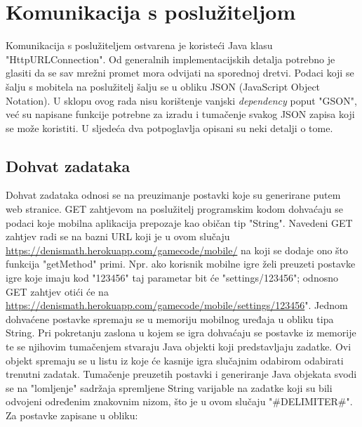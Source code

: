 \documentclass[times, utf8, zavrsni, numeric]{fer}
\begin{document}
	
	\section{Komunikacija s poslužiteljom}
	Komunikacija s poslužiteljem ostvarena je koristeći Java klasu "HttpURLConnection". Od generalnih implementacijskih detalja potrebno je glasiti da se sav mrežni promet mora odvijati na sporednoj dretvi. 
	Podaci koji se šalju s mobitela na poslužitelj šalju se u obliku JSON (JavaScript Object Notation). U sklopu ovog rada nisu korištenje vanjski \textit{dependency} poput "GSON", već
	su napisane funkcije potrebne za izradu i tumačenje svakog JSON zapisa koji se može koristiti. U sljedeća dva potpoglavlja opisani su neki detalji o tome.
	\subsection{Dohvat zadataka}
	Dohvat zadataka odnosi se na preuzimanje postavki koje su generirane putem web stranice. GET zahtjevom na poslužitelj programskim kodom dohvaćaju se podaci koje mobilna aplikacija prepozaje kao običan tip "String".
	Navedeni GET zahtjev radi se na bazni URL koji je u ovom slučaju  \url{https://denismath.herokuapp.com/gamecode/mobile/} na koji se dodaje ono što funkcija "getMethod" primi. Npr. ako korisnik mobilne igre želi preuzeti postavke
	igre koje imaju kod "123456"  taj parametar bit će "settings/123456"; odnosno GET zahtjev otići će na \url{https://denismath.herokuapp.com/gamecode/mobile/settings/123456}".
	Jednom dohvaćene postavke spremaju se u memoriju mobilnog uređaja u obliku tipa String. Pri pokretanju zaslona u kojem se igra dohvaćaju se postavke iz memorije te se njihovim tumačenjem stvaraju Java objekti koji predstavljaju zadatke.
	Ovi objekt spremaju se u listu iz koje će kasnije igra slučajnim odabirom odabirati trenutni zadatak. Tumačenje preuzetih postavki i generiranje Java objekata svodi se na "lomljenje" sadržaja spremljene String varijable
	na zadatke koji su bili odvojeni određenim znakovnim nizom, što je u ovom slučaju "\#DELIMITER\#".
	Za postavke zapisane u obliku:
	
\end{document}
